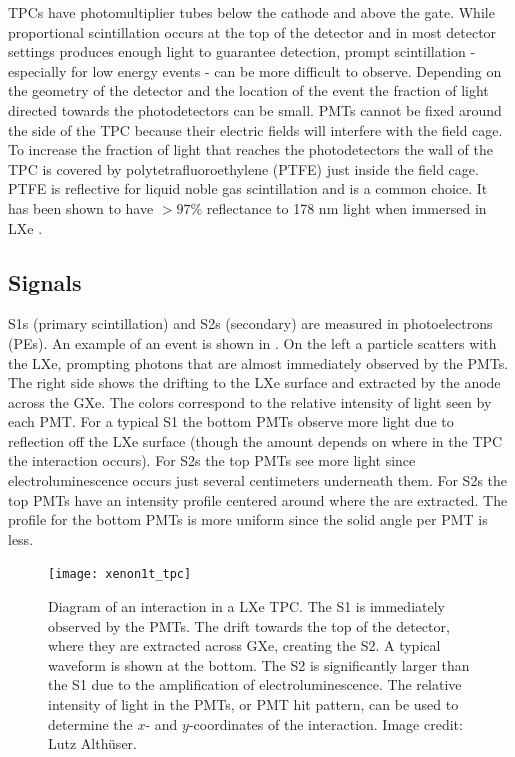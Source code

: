 TPCs have photomultiplier tubes below the cathode and above the gate.  While proportional scintillation occurs at the top of the detector
and in most detector settings produces enough light to guarantee detection, prompt scintillation - especially for low energy events - can
be more difficult to observe.  Depending on the geometry of the detector and the location of the event the fraction of light
directed towards the photodetectors can
be small.  PMTs cannot be fixed around the side of the TPC because their electric fields will interfere with the field
cage.  To increase
the fraction of light that reaches the photodetectors the wall of the TPC is covered by polytetrafluoroethylene (PTFE) just inside the
field cage.  PTFE is reflective for liquid noble gas scintillation and is a common choice.  It has been shown to have $> 97 \%$
reflectance to 178 nm light when immersed in LXe .



\subsection{Signals}
\label{subsec:tpcs_signals}
S1s (primary scintillation) and S2s (secondary) are measured in photoelectrons (PEs).  An example of an
event is shown in .  On the left a particle scatters with the LXe, prompting photons that are almost
immediately observed by the PMTs.  The right side shows the \electron drifting to the LXe surface and
extracted by the anode across the GXe.  The colors correspond to the relative intensity of light seen by each PMT.  For a typical S1 the
bottom PMTs observe more light due to reflection off the LXe surface (though the amount depends on where in the TPC the interaction
occurs).  For S2s the top PMTs see more light since electroluminescence occurs just several centimeters underneath them.  For S2s
the top PMTs have an intensity profile centered around where the \electron are extracted.  The profile for the bottom PMTs is more
uniform since the solid angle per PMT is less.

\begin{figure}
\centering
\texttt{[image: xenon1t\_tpc]}
\caption{Diagram of an interaction in a LXe TPC.  The S1 is immediately
observed by the PMTs.  The \electron drift towards the top of the detector, where they are extracted across GXe,
creating the S2.  A typical waveform is shown at the bottom.  The S2 is significantly
larger than the S1 due to the amplification of electroluminescence.  The relative intensity of light in the PMTs, or PMT hit
pattern, can be used to determine the $x$- and $y$-coordinates of the interaction.  Image credit: Lutz Alth\"{u}ser.}
\label{fig:tpcs_signal_tpc}
\end{figure}



